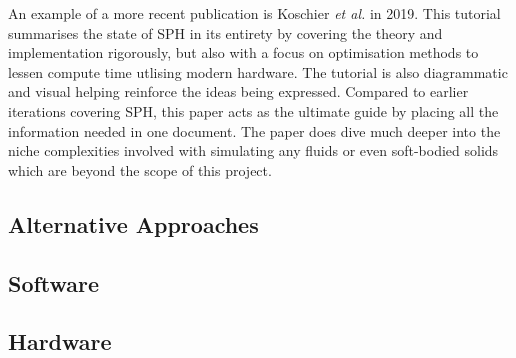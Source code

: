 \documentclass[write-up.tex]{subfiles}
\begin{document}
An example of a more recent publication is Koschier \textit{et al.} \cite{koschier} in 2019. This tutorial summarises the state of SPH in its entirety by covering the theory and implementation rigorously, but also with a focus on optimisation methods to lessen compute time utlising modern hardware. The tutorial is also diagrammatic and visual helping reinforce the ideas being expressed. Compared to earlier iterations covering SPH, this paper acts as the ultimate guide by placing all the information needed in one document. The paper does dive much deeper into the niche complexities involved with simulating any fluids or even soft-bodied solids which are beyond the scope of this project.%

\subsection{Alternative Approaches}
\subsection{Software}
\subsection{Hardware}
\end{document}
